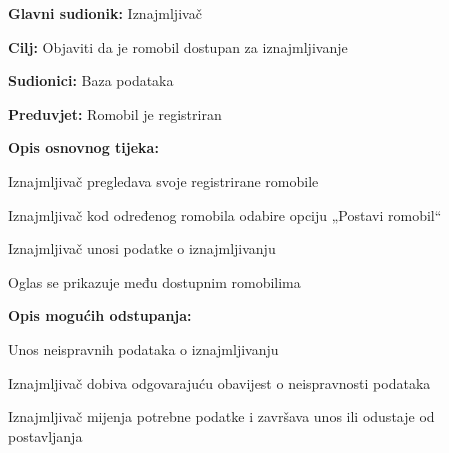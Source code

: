 						\begin{packed_item}
							
							\item \textbf{Glavni sudionik: }Iznajmljivač
							\item  \textbf{Cilj: }Objaviti da je romobil dostupan za iznajmljivanje
							\item  \textbf{Sudionici:} Baza podataka
							\item  \textbf{Preduvjet:} Romobil je registriran
							\item  \textbf{Opis osnovnog tijeka:}
							
							\item[] \begin{packed_enum}
								
								\item Iznajmljivač pregledava svoje registrirane romobile 
								\item Iznajmljivač kod određenog romobila odabire opciju „Postavi romobil“ 
								\item Iznajmljivač unosi podatke o iznajmljivanju 
								\item Oglas se prikazuje među dostupnim romobilima   
							\end{packed_enum}
							
							\item  \textbf{Opis mogućih odstupanja:}
							
							\item[] \begin{packed_item}
								
								\item[3.a] Unos neispravnih podataka o iznajmljivanju 
								\item[] \begin{packed_enum}
									
									\item Iznajmljivač dobiva odgovarajuću obavijest o neispravnosti podataka 
									\item Iznajmljivač mijenja potrebne podatke i završava unos ili odustaje od postavljanja 
									
								\end{packed_enum}
								
								
							\end{packed_item}
						\end{packed_item}
						\noindent {}

